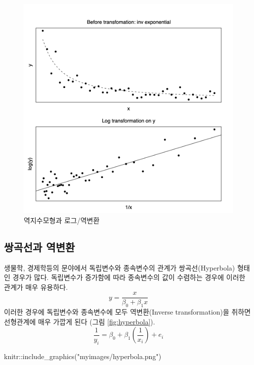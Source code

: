\documentclass[
  10pt,
]{book}
\newenvironment{Shaded}{\begin{snugshade}}{\end{snugshade}}
\newcommand{\FunctionTok}[1]{\textcolor[rgb]{0.00,0.00,0.00}{#1}}
\newcommand{\NormalTok}[1]{#1}
\newcommand{\SpecialCharTok}[1]{\textcolor[rgb]{0.00,0.00,0.00}{#1}}
\newcommand{\StringTok}[1]{\textcolor[rgb]{0.31,0.60,0.02}{#1}}
\theoremstyle{definition}
\theoremstyle{definition}
\theoremstyle{definition}
\theoremstyle{definition}
\theoremstyle{remark}
\begin{document}
\begin{figure}
\includegraphics[width=0.8\linewidth]{myimages/invexp} \caption{역지수모형과 로그/역변환}\label{fig:invexpz}
\end{figure}

\hypertarget{uxc30duxace1uxc120uxacfc-uxc5eduxbcc0uxd658}{%
\subsection{쌍곡선과 역변환}\label{uxc30duxace1uxc120uxacfc-uxc5eduxbcc0uxd658}}

생물학, 경제학등의 문야에서 독립변수와 종속변수의 관계가 쌍곡선(Hyperbola) 형태인 경우가 많다. 독립변수가 증가함에 따라 종속변수의 값이 수렴하는 경우에 이러한 관계가 매우 유용하다.
\[ y = \frac{x}{\beta_0 + \beta_1 x} \]
이러한 경우에 독립변수와 종속변수에 모두 역변환(Inverse transformation)을 취하면 선형관계에 매우 가깝게 된다 (그림 \ref{fig:hyperbola}).
\[ \frac{1}{y_i} = \beta_0 + \beta_1 \left ( \frac{1}{x_i} \right ) + e_i \]

\begin{Shaded}
\begin{Highlighting}[]
\NormalTok{knitr}\SpecialCharTok{::}\FunctionTok{include\_graphics}\NormalTok{(}\StringTok{"myimages/hyperbola.png"}\NormalTok{)}
\end{Highlighting}
\end{Shaded}
\end{document}
